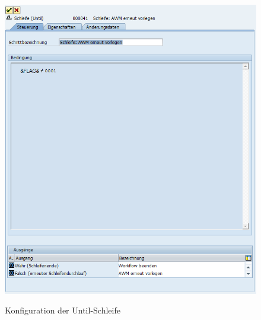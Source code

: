 \begin{figure}[H]
	\begin{center}
	\includegraphics[width=1.0\textwidth]{grafiken/wf-builder_bsp2_act_loop.png}
	\caption{Konfiguration der Until-Schleife}
	\vspace{-10pt}
	\label{abb:workflow-bsp2-act_loop}
	\end{center}
\end{figure}

